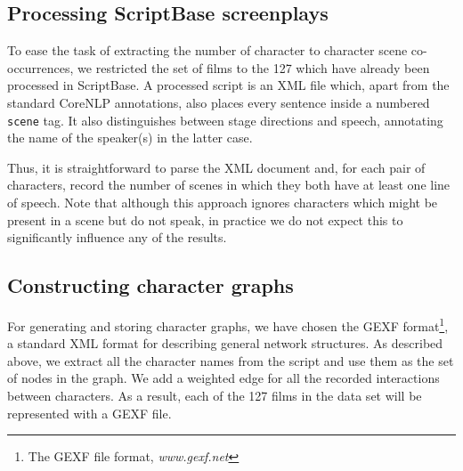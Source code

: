 \documentclass[bsc,frontabs,singlespacing,parskip, twoside]{infthesis}
\begin{document}
\subsection{Processing ScriptBase screenplays}
\label{sec:processing_scriptbase}
To ease the task of extracting the number of character to character scene co-occurrences, we restricted the set of films to the 127 which have already been processed in ScriptBase. A processed script is an XML file which, apart from the standard CoreNLP annotations, also places every sentence inside a numbered \texttt{scene} tag. It also distinguishes between stage directions and speech, annotating the name of the speaker(s) in the latter case.

Thus, it is straightforward to parse the XML document and, for each pair of characters, record the number of scenes in which they both have at least one line of speech. Note that although this approach ignores characters which might be present in a scene but do not speak, in practice we do not expect this to significantly influence any of the results.

\subsection{Constructing character graphs}
For generating and storing character graphs, we have chosen the GEXF format\footnote{The GEXF file format, \textit{www.gexf.net}}, a standard XML format for describing general network structures. As described above, we extract all the character names from the script and use them as the set of nodes in the graph. We add a weighted edge for all the recorded interactions between characters. As a result, each of the 127 films in the data set will be represented with a GEXF file.
\end{document}
